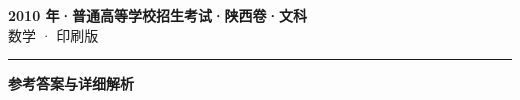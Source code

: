 \documentclass[zihao=5, a4paper]{ctexart}
\begin{document}
\begin{center}
  {\Large\bfseries 2010 年·普通高等学校招生考试·陕西卷·文科}\\[4pt]
  {\large 数学 · 印刷版}
\end{center}
\medskip
{}

\par\bigskip\hrule\bigskip
{}
\begin{center}{\large\bfseries 参考答案与详细解析}\end{center}
\smallskip

\end{document}
